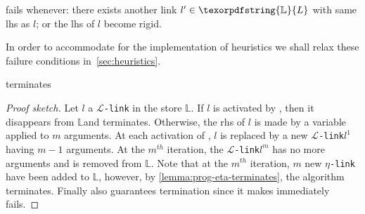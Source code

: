 \documentclass[sigconf,natbib=false,review]{acmart}
\newcommand{\llambda}{\ensuremath{\mathcal{L}}\xspace}
\newcommand{\linkMacro}[1]{\ensuremath{#1}\texttt{-link}\xspace}
\newcommand{\linkbeta}{\linkMacro{\llambda}}
\newcommand{\linketa} {\linkMacro{\eta}}
\newcommand{\lhs}{lhs\xspace}
\newcommand{\rhs}{rhs\xspace}
\newcommand{\linkStore}{\texorpdfstring{\ensuremath{\mathbb{L}}\xspace}{L}}
\begin{document}
\begin{definition}[\progBetaFail]
  \progress fails whenever:
  there exists another link $l' \in \linkStore$ with same \lhs as $l$;
  or the \lhs  of $l$ become rigid.
  \label{def:progBetaFail}
\end{definition}

\noindent In order to accommodate for the implementation of heuristics we
shall relax these failure conditions in~\cref{sec:heuristics}.

\begin{lemma}
   terminates
\end{lemma}

\begin{proof}[Proof sketch]
  Let $l$ a \linkbeta in the store \linkStore. If $l$ is activated by
  \progBetaRH{}, then it disappears from \linkStore and 
  terminates. Otherwise, the \rhs of $l$ is made by a variable applied to $m$
  arguments. At each activation of \progBetaLL, $l$ is replaced by a new
  \linkbeta $l^1$ having $m-1$ arguments. At the $m^{th}$ iteration, the
  \linkbeta $l^m$ has no more arguments and is removed from \linkStore.
  Note that at the $m^{th}$ iteration, $m$ new \linketa have been added to
  \linkStore, however, by \cref{lemma:prog-eta-terminates}, the algorithm
  terminates. Finally \progBetaFail also guarantees termination since 
  it makes  immediately fails.

\end{proof}

\end{document}
